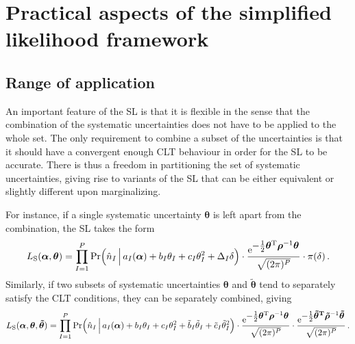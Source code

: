 \documentclass[11pt]{article}
\newcommand{\be}{\begin{equation}}
\newcommand{\ee}{\end{equation}}
\begin{document}
\section{Practical aspects of the simplified likelihood framework}
\label{se:practice}

\subsection{Range of application}

An important feature of the SL is that it is flexible in the sense that the combination of the systematic uncertainties does not have to be applied to the whole set.  The only requirement to combine a subset of the  uncertainties is that it should have a convergent enough  CLT behaviour in order  for the SL to be accurate. There is thus a freedom in partitioning the set of systematic uncertainties, giving rise to variants of the SL that can be either equivalent or slightly different upon  marginalizing.





For instance, if a single systematic uncertainty $\bm{\theta}$ is left apart from the combination, the SL takes the form
\be
 L_{\rm{S}}(\bm{\alpha},\bm{\theta}) = \prod_{I=1}^P \mathrm{Pr}\Big( \hat{n}_I\,\Big|\,a_{I}(\bm{\alpha})+b_I\theta_I+c_I\theta_I^2 + \Delta_I  \delta   \Big) \cdot
    \frac{ \mathrm{e}^{{\textstyle-\frac{1}{2}\bm \theta^{\rm T} \bm{\rho}^{-1} \bm \theta}}}{\sqrt{(2\pi)^P }}
    \cdot \pi(\delta) \,. \label{eq:SL_variants1}
\ee
Similarly, if two subsets of systematic uncertainties $\bm{\theta}$ and $\bm{\tilde \theta}$ tend to  separately satisfy the CLT conditions,  they can be separately combined, giving %
\be
 L_{\rm{S}}(\bm{\alpha},\bm{\theta},\bm{\tilde \theta}) = \prod_{I=1}^P \mathrm{Pr}\Big( \hat{n}_I\,\Big|\,a_{I}(\bm{\alpha})+b_I\theta_I+c_I\theta_I^2 + \tilde b_I \tilde \theta_I+ \tilde c_I \tilde \theta_I^2  \Big) \cdot
    \frac{ \mathrm{e}^{{\textstyle-\frac{1}{2}\bm \theta^{\rm T} \bm{\rho}^{-1} \bm \theta}}}{\sqrt{(2\pi)^P }}
\cdot \frac{ \mathrm{e}^{{\textstyle-\frac{1}{2}\bm{ \tilde\theta^{\rm T}} \bm{\tilde \rho}^{-1} \bm{ \tilde\theta}}}}{\sqrt{(2\pi)^P }}
      \,. \label{eq:SL_variants2}
\ee
\end{document}
